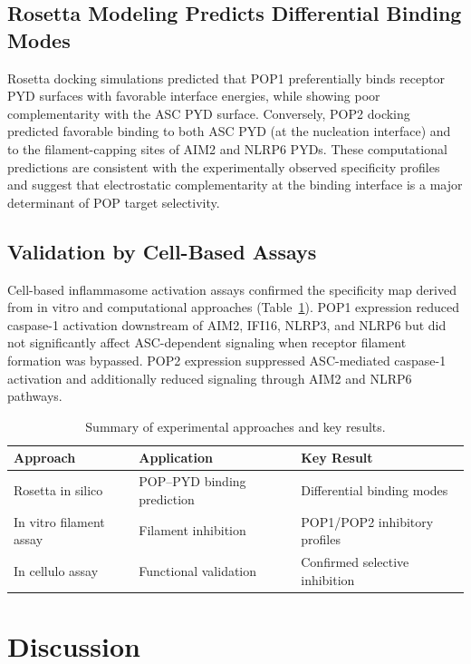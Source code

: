 \documentclass[11pt]{article}
\begin{document}
\subsection{Rosetta Modeling Predicts Differential Binding Modes}

Rosetta docking simulations predicted that POP1 preferentially binds receptor PYD surfaces with favorable interface energies, while showing poor complementarity with the ASC PYD surface. Conversely, POP2 docking predicted favorable binding to both ASC PYD (at the nucleation interface) and to the filament-capping sites of AIM2 and NLRP6 PYDs. These computational predictions are consistent with the experimentally observed specificity profiles and suggest that electrostatic complementarity at the binding interface is a major determinant of POP target selectivity.

\subsection{Validation by Cell-Based Assays}

Cell-based inflammasome activation assays confirmed the specificity map derived from in vitro and computational approaches (Table~\ref{tab:methods}). POP1 expression reduced caspase-1 activation downstream of AIM2, IFI16, NLRP3, and NLRP6 but did not significantly affect ASC-dependent signaling when receptor filament formation was bypassed. POP2 expression suppressed ASC-mediated caspase-1 activation and additionally reduced signaling through AIM2 and NLRP6 pathways.

\begin{table}[ht]
\centering
\caption{Summary of experimental approaches and key results.}
\label{tab:methods}
\begin{tabular}{lll}
\toprule
\textbf{Approach} & \textbf{Application} & \textbf{Key Result} \\
\midrule
Rosetta in silico & POP--PYD binding prediction & Differential binding modes \\
In vitro filament assay & Filament inhibition & POP1/POP2 inhibitory profiles \\
In cellulo assay & Functional validation & Confirmed selective inhibition \\
\bottomrule
\end{tabular}
\end{table}

\section{Discussion}
\end{document}
